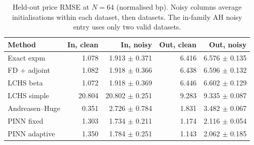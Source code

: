 \begin{table}[htbp]\centering\caption{Held-out price RMSE at $N=64$ (normalised bp). Noisy columns average initialisations within each dataset, then datasets. The in-family AH noisy entry uses only two valid datasets.}\small
\begin{tabular}{lrrrr}\toprule Method & In, clean & In, noisy & Out, clean & Out, noisy\\\midrule
Exact expm & 1.078 & 1.913 $\pm$ 0.371 & 6.416 & 6.576 $\pm$ 0.135\\
FD + adjoint & 1.082 & 1.918 $\pm$ 0.366 & 6.438 & 6.596 $\pm$ 0.132\\
LCHS beta & 1.072 & 1.918 $\pm$ 0.369 & 6.446 & 6.602 $\pm$ 0.129\\
LCHS simple & 20.804 & 20.802 $\pm$ 0.251 & 9.283 & 9.335 $\pm$ 0.087\\
Andreasen--Huge & 0.351 & 2.726 $\pm$ 0.784 & 1.831 & 3.482 $\pm$ 0.067\\
PINN fixed & 1.303 & 1.734 $\pm$ 0.211 & 1.174 & 2.116 $\pm$ 0.054\\
PINN adaptive & 1.350 & 1.784 $\pm$ 0.251 & 1.143 & 2.062 $\pm$ 0.185\\
\bottomrule\end{tabular}\end{table}